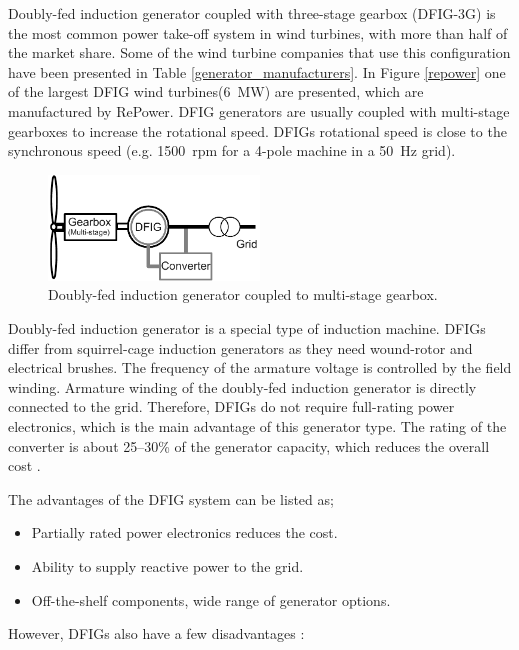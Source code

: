 \documentclass[a4paper, 11pt]{article} %
\begin{document}
Doubly-fed induction generator coupled with three-stage gearbox (DFIG-3G) is the most common power take-off system in wind turbines, with more than half of the market share. Some of the wind turbine companies that use this configuration have been presented in Table \ref{generator_manufacturers}.
In Figure \ref{repower} one of the largest DFIG wind turbines(6~MW) are presented, which are  manufactured by RePower.
DFIG generators are usually coupled with multi-stage gearboxes to increase the rotational speed. DFIGs rotational speed is close to the synchronous speed (e.g. 1500~rpm for a 4-pole machine in a 50~Hz grid).

  \begin{figure}
    \centering
    \includegraphics[width=0.5\textwidth]{DFIG_3G}
    \caption{Doubly-fed induction generator coupled to multi-stage gearbox.} 
    \label{dfig_3g}
  \end{figure}

Doubly-fed induction generator is a special type of induction machine. DFIGs differ from squirrel-cage induction generators as they need wound-rotor and electrical brushes. The frequency of the armature voltage is controlled by the field winding. Armature winding of the doubly-fed induction generator is directly connected to the grid. Therefore, DFIGs do not require full-rating power electronics, which is the main advantage of this generator type. The rating of the converter is about 25--30\% of the generator capacity, which reduces the overall cost \cite{Li2008a} . 

The advantages of the DFIG system can be listed as;

\begin{itemize}
	\item Partially rated power electronics reduces the cost.
	\item Ability to supply reactive power to the grid.
	\item Off-the-shelf components, wide range of generator options.
\end{itemize}

However, DFIGs also have a few disadvantages \cite{Li2008a}:
\end{document}

